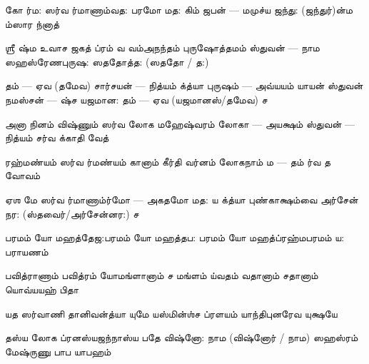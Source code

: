 \documentclass[10pt]{article}
\begin{document}
{%
\SlokaLarge
{கோ ர்ம: ஸர்வ ர்மாணாம்}{வத: பரமோ மத:}
{கிம் ஜபன் — மமுச்ய ஜந்து: (ஜந்துர்)}{ன்ம ம்ஸார ந்னாத்}

\SlokaHeaderLarge
{ஶ்ரீ ஷ்ம உவாச}
{ஜகத் ப்ரம் வ வம்}{அநந்தம் புருஷோத்தமம்}
{ஸ்துவன் — நாம ஸஹஸ்ரேண}{புருஷ: ஸததோத்த: (ஸததோ / த:)}

\newpage
\SlokaLarge
{தம் — ஏவ (தமேவ) சார்சயன் — நித்யம்} {க்த்யா புருஷம் — அவ்யயம்}
{யாயன் ஸ்துவன் நமஸ்சன் — ஷ்ச} {யஜமான: தம் — ஏவ (யஜமானஸ்/தமேவ) ச}

\SlokaLarge
{அனா நினம் விஷ்ணும்} {ஸர்வ லோக மஹேஷ்வரம்}
{லோகா — அயக்ஷம் ஸ்துவன் — நித்யம்} {சர்வ க்காதி வேத்}

\SlokaLarge
{ரஹ்மண்யம் ஸர்வ ர்மண்யம்} {கானாம் கீர்தி வர்னம்}
{லோகநாம் ம — தம்} {ர்வ த வோவம்}

\SlokaLarge
{ஏஶ மே ஸர்வ ர்மாணாம்}{ர்மோ — அகதமோ மத:}
{ய \dash {}க்த்யா புண்காக்ஷம்}{வை அர்சேன் நர: (ஸ்தவைர்/அர்சேன்னர:) ச}

\newpage 
\SlokaLarge
{பரமம் யோ மஹத்தேஜ:}{பரமம் யோ மஹத்தப:}
{பரமம் யோ மஹத்ப்ரஹ்ம}{பரமம் ய: பராயணம்}

\SlokaLarge
{பவித்ராணாம் பவித்ரம் யோ}{மங்ளானாம் ச மங்ளம்}
{ய்வதம் வதானாம் ச}{தானாம் யொவ்யயஹ் பிதா}

\SlokaLarge
{யத ஸர்வாணி தானி}{வன்த்யா யுமே}
{யஸ்மின்ஶ்ச ப்ரளயம் யாந்தி}{புனரேவ யுக்ஷயே}

\SlokaLarge
{தஸ்ய லோக ப்ரனஸ்ய}{ஜந்நாஸ்ய பதே}
{விஷ்னோ: \dash நாம (விஷ்னோர் / நாம) ஸஹஸ்ரம் மே}{ஷ்ருணு பாப யாபஹம்}

}
\end{document}
